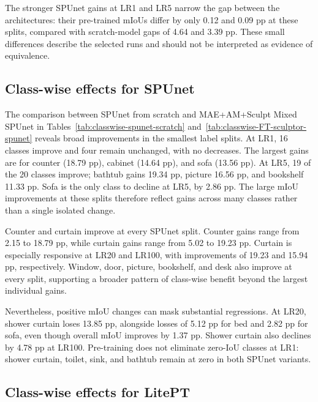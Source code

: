 The stronger SPUnet gains at LR1 and LR5 narrow the gap between the architectures: their pre-trained mIoUs differ by only 0.12 and 0.09 pp at these splits, compared with scratch-model gaps of 4.64 and 3.39 pp. These small differences describe the selected runs and should not be interpreted as evidence of equivalence.

\subsection{Class-wise effects for SPUnet}

The comparison between SPUnet from scratch and MAE+AM+Sculpt Mixed SPUnet in Tables~\ref{tab:classwise-spunet-scratch} and~\ref{tab:classwise-FT-sculptor-spunet} reveals broad improvements in the smallest label splits. At LR1, 16 classes improve and four remain unchanged, with no decreases. The largest gains are for counter (18.79 pp), cabinet (14.64 pp), and sofa (13.56 pp). At LR5, 19 of the 20 classes improve; bathtub gains 19.34 pp, picture 16.56 pp, and bookshelf 11.33 pp. Sofa is the only class to decline at LR5, by 2.86 pp. The large mIoU improvements at these splits therefore reflect gains across many classes rather than a single isolated change.

Counter and curtain improve at every SPUnet split. Counter gains range from 2.15 to 18.79 pp, while curtain gains range from 5.02 to 19.23 pp. Curtain is especially responsive at LR20 and LR100, with improvements of 19.23 and 15.94 pp, respectively. Window, door, picture, bookshelf, and desk also improve at every split, supporting a broader pattern of class-wise benefit beyond the largest individual gains.

Nevertheless, positive mIoU changes can mask substantial regressions. At LR20, shower curtain loses 13.85 pp, alongside losses of 5.12 pp for bed and 2.82 pp for sofa, even though overall mIoU improves by 1.37 pp. Shower curtain also declines by 4.78 pp at LR100. Pre-training does not eliminate zero-IoU classes at LR1: shower curtain, toilet, sink, and bathtub remain at zero in both SPUnet variants.




\subsection{Class-wise effects for LitePT}

